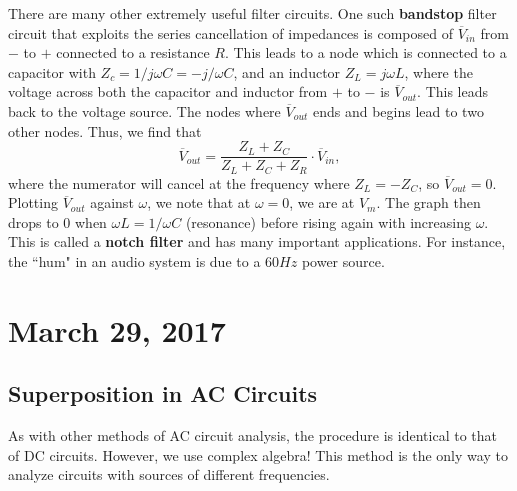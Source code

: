 \documentclass[11pt]{article}
\theoremstyle{plain} %
\theoremstyle{definition}
\theoremstyle{example}
\theoremstyle{remark}
\begin{document}
There are many other extremely useful filter circuits. One such \textbf{bandstop} filter circuit that exploits the series cancellation of impedances is composed of $\overline V_{in}$ from $-$ to $+$ connected to a resistance $R$. This leads to a node which is connected to a capacitor with $Z_c = 1/j\omega C = -j/\omega C$, and an inductor $Z_L = j\omega L$, where the voltage across both the capacitor and inductor from $+$ to $-$ is $\overline V_{out}$. This leads back to the voltage source. The nodes where $\overline V_{out}$ ends and begins lead to two other nodes. Thus, we find that 
$$\overline V_{out} = \frac{Z_L + Z_C}{Z_L+Z_C+Z_R} \cdot \overline V_{in},$$
where the numerator will cancel at the frequency where $Z_L = -Z_C$, so $\overline V_{out} = 0$. Plotting $\overline V_{out}$ against $\omega$, we note that at $\omega=0$, we are at $V_m$. The graph then drops to 0 when $\omega L = 1/\omega C$ (resonance) before rising again with increasing $\omega$. This is called a \textbf{notch filter} and has many important applications. For instance, the ``hum" in an audio system is due to a $60Hz$ power source. 


\section{March 29, 2017}
\subsection{Superposition in AC Circuits}

As with other methods of AC circuit analysis, the procedure is identical to that of DC circuits. However, we use complex algebra! This method is the only way to analyze circuits with sources of different frequencies. 
\end{document}
